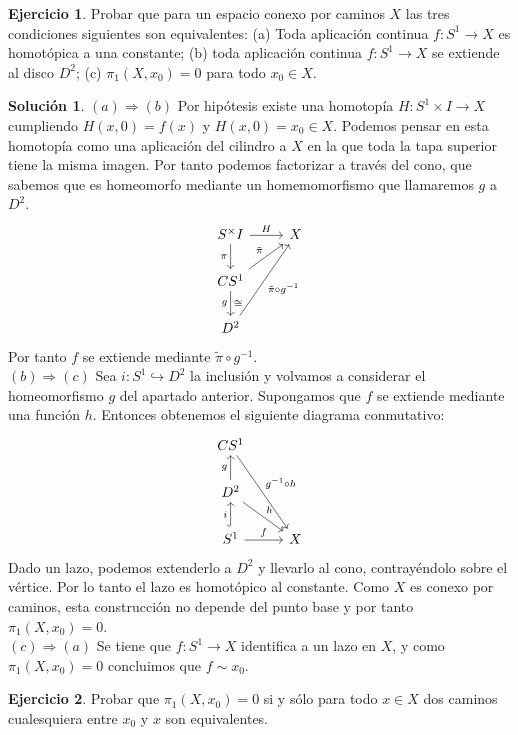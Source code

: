 \documentclass{article}
\theoremstyle{plain}
\theoremstyle{definition}
\newtheorem{exercise}{Ejercicio}
\newtheorem*{sol*}{Solución}
\begin{document}
\newpage \begin{exercise} Probar que para un espacio conexo por caminos $X$ las tres condiciones siguientes son equivalentes:
(a) Toda aplicaci\'on continua $f: S^1\to X$ es homot\'opica a una constante; (b) toda aplicaci\'on continua $f: S ^1 \to X$ se extiende al disco $D^2$;
(c) $\pi_1(X,x_0) = 0$ para todo $x_0\in X$.
\end{exercise}
\begin{sol*}
$\boxed{(a)\Rightarrow(b)}$ Por hipótesis existe una homotopía $H:S^1\times I\to X$ cumpliendo $H(x,0)=f(x)$ y $H(x,0)=x_0\in X$. Podemos pensar en esta homotopía como una aplicación del cilindro a $X$ en la que toda la tapa superior tiene la misma imagen. Por tanto podemos factorizar a través del cono, que sabemos que es homeomorfo mediante un homemomorfismo que llamaremos $g$ a $D^2$.
\[
\begin{tikzcd}
S^\times I\arrow[r,"H"]\arrow[d,"\pi"']& X\\
CS^1\arrow[ur,"\tilde{\pi}"]\arrow[d,"g"',"\cong"]\\
D^2\arrow[uur,"\tilde{\pi}\circ g^{-1}"']
\end{tikzcd}
\]
Por tanto $f$ se extiende mediante $\tilde{\pi}\circ g^{-1}$.\\
$\boxed{(b)\Rightarrow(c)}$ Sea $i:S^1\hookrightarrow D^2$ la inclusión y volvamos a considerar el homeomorfismo $g$ del apartado anterior. Supongamos que $f$ se extiende mediante una función $h$. Entonces obtenemos el siguiente diagrama conmutativo:
\[
\begin{tikzcd}
CS^1\arrow[ddr,"g^{-1}\circ h"]\\
D^2\arrow[u,"g"]\arrow[dr,"h"]\\
S^1\arrow[u,"i",hookrightarrow]\arrow[r,"f"]& X
\end{tikzcd}
\]
Dado un lazo, podemos extenderlo a $D^2$ y llevarlo al cono, contrayéndolo sobre el vértice. Por lo tanto el lazo es homotópico al constante. Como $X$ es conexo por caminos, esta construcción no depende del punto base y por tanto $\pi_1(X,x_0)=0$.\\
$\boxed{(c)\Rightarrow(a)}$ Se tiene que $f:S^1\to X$ identifica a un lazo en $X$, y como $\pi_1(X,x_0)=0$ concluimos que $f\sim x_0$.
\end{sol*}
\newpage 

\begin{exercise}
Probar que $\pi_1(X,x_0) = 0$ si y s\'olo para todo $x\in X$ dos caminos cualesquiera entre $x_0$ y $x$ son equivalentes.
\end{exercise}
\end{document}
